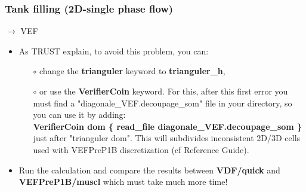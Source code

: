 \documentclass[10pt, hyperref={unicode=true,pdfusetitle, bookmarks=true,bookmarksnumbered=false,bookmarksopen=false, breaklinks=false,pdfborder={0 0 1},backref=true,colorlinks=true,linkcolor=darkblue,pageanchor}]{beamer}
\begin{document}
\begin{frame}
\frametitle{Tank filling (2D-single phase flow)}
\begin{block}{$\rightarrow$ VEF}

\begin{itemize}
\item As TRUST explain, to avoid this problem, you can:
    \begin{itemize}
    \item [$\circ$] change the \textbf{trianguler} keyword to \textbf{trianguler\_h}, 
    \item [$\circ$] or use the \textbf{VerifierCoin} keyword. For this, after this first error you must find a "diagonale\_VEF.decoupage\_som" file in your directory, so you can use it by adding:\\
    \textbf{VerifierCoin dom \{ read\_file diagonale\_VEF.decoupage\_som \} }\\
    just after "trianguler dom". This will subdivides inconsistent 2D/3D cells used with VEFPreP1B discretization (cf Reference Guide).
    \end{itemize}

\item Run the calculation and compare the results between \textbf{VDF/quick} and \textbf{VEFPreP1B/muscl} which must take much more time!
\end{itemize}

\end{block}
\end{frame}
\end{document}
